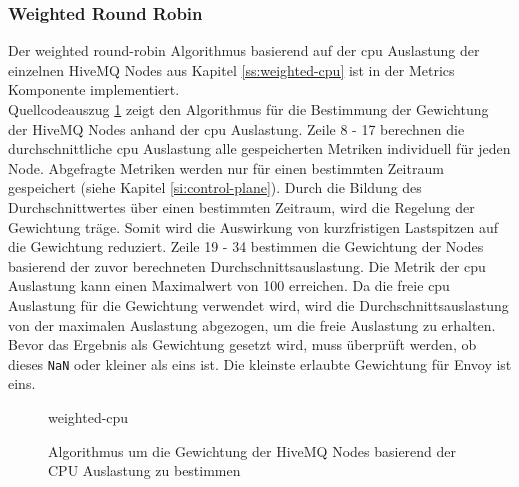 \subsubsection{Weighted Round Robin}
Der weighted round-robin Algorithmus basierend auf der \ac{cpu} Auslastung der einzelnen HiveMQ Nodes aus Kapitel \ref{ss:weighted-cpu} ist in der Metrics Komponente implementiert.
\\
Quellcodeauszug \ref{code:weighted-cpu} zeigt den Algorithmus für die Bestimmung der Gewichtung der HiveMQ Nodes anhand der \ac{cpu} Auslastung.
Zeile 8 - 17 berechnen die durchschnittliche \ac{cpu} Auslastung alle gespeicherten Metriken individuell für jeden Node. Abgefragte Metriken werden nur für einen bestimmten Zeitraum gespeichert (siehe Kapitel \ref{si:control-plane}). Durch die Bildung des Durchschnittwertes über einen bestimmten Zeitraum, wird die Regelung der Gewichtung träge. Somit wird die Auswirkung von kurzfristigen Lastspitzen auf die Gewichtung reduziert.
Zeile 19 - 34 bestimmen die Gewichtung der Nodes basierend der zuvor berechneten Durchschnittsauslastung. Die Metrik der \ac{cpu} Auslastung kann einen Maximalwert von 100 erreichen. Da die freie \ac{cpu} Auslastung für die Gewichtung verwendet wird, wird die Durchschnittsauslastung von der maximalen Auslastung abgezogen, um die freie Auslastung zu erhalten. Bevor das Ergebnis als Gewichtung gesetzt wird, muss überprüft werden, ob dieses \verb|NaN| oder kleiner als eins ist. Die kleinste erlaubte Gewichtung für Envoy ist eins.
\begin{figure}
    {weighted-cpu}
    \caption{Algorithmus um die Gewichtung der HiveMQ Nodes basierend der CPU Auslastung zu bestimmen}
    \label{code:weighted-cpu}
\end{figure}

